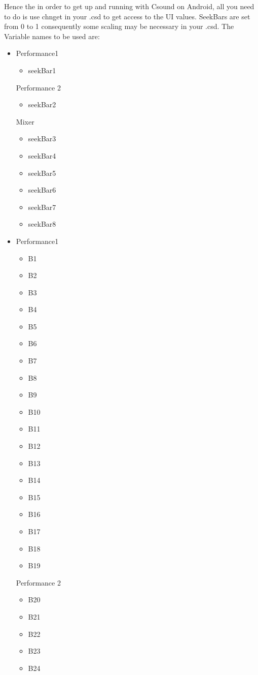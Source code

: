 \documentclass[11pt]{article}
\begin{document}
Hence the in order to get up and running with Csound on Android, all you need to do is use chnget in your .csd to get access to the UI values. SeekBars are set from 0 to 1 consequently some scaling may be necessary in your .csd. The Variable names to be used are:

\begin{itemize}
\item Performance1
\begin{itemize}
\item seekBar1
\end{itemize}
Performance 2
\begin{itemize}
\item seekBar2
\end{itemize}
Mixer
\begin{itemize}
\item seekBar3
\item seekBar4
\item seekBar5
\item seekBar6
\item seekBar7
\item seekBar8
\end{itemize}
\end{itemize}

\begin{itemize}
\item Performance1
\begin{itemize}
\item B1
\item B2
\item B3
\item B4
\item B5
\item B6
\item B7
\item B8
\item B9
\item B10
\item B11
\item B12
\item B13
\item B14
\item B15
\item B16
\item B17
\item B18
\item B19
\end{itemize}
Performance 2
\begin{itemize}
\item B20
\item B21
\item B22
\item B23
\item B24
\end{itemize}
\end{itemize}
\end{document}
